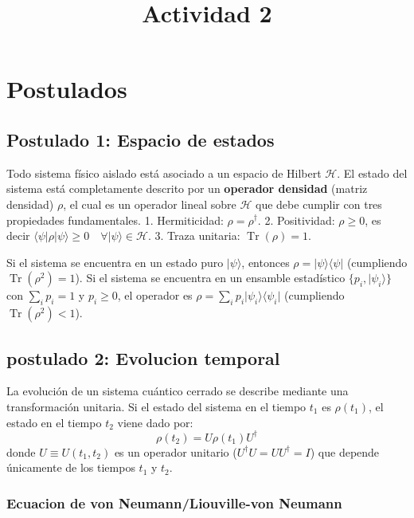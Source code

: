 \documentclass[11pt]{article}
\title{Actividad 2}
\begin{document}
    
    \maketitle
    
    

    
    \section{Postulados}\label{postulados}

\subsection{Postulado 1: Espacio de
estados}\label{postulado-1-espacio-de-estados}

Todo sistema físico aislado está asociado a un espacio de Hilbert
\(\mathcal{H}\). El estado del sistema está completamente descrito por
un \textbf{operador densidad} (matriz densidad) \(\rho\), el cual es un
operador lineal sobre \(\mathcal{H}\) que debe cumplir con tres
propiedades fundamentales. 1. Hermiticidad: \(\rho = \rho^{\dagger}\).
2. Positividad: \(\rho \ge 0\), es decir
\(\langle\psi\vert{}\rho\vert{}\psi\rangle \ge 0 \quad \forall \vert{}\psi\rangle \in \mathcal{H}\).
3. Traza unitaria: \(\operatorname{Tr}(\rho) = 1\).

Si el sistema se encuentra en un estado puro \(\vert{}\psi\rangle\),
entonces \(\rho = \vert{}\psi\rangle\langle\psi\vert{}\) (cumpliendo
\(\operatorname{Tr}(\rho^2) = 1\)). Si el sistema se encuentra en un
ensamble estadístico \(\{p_i, \vert{}\psi_i\rangle\}\) con
\(\sum_i p_i = 1\) y \(p_i \ge 0\), el operador es
\(\rho = \sum_i p_i \vert{}\psi_i\rangle\langle\psi_i\vert{}\)
(cumpliendo \(\operatorname{Tr}(\rho^2) < 1\)).

    \subsection{postulado 2: Evolucion
temporal}\label{postulado-2-evolucion-temporal}

La evolución de un sistema cuántico cerrado se describe mediante una
transformación unitaria. Si el estado del sistema en el tiempo \(t_1\)
es \(\rho(t_1)\), el estado en el tiempo \(t_2\) viene dado por:
\[\rho(t_2) = U \rho(t_1) U^\dagger\] donde \(U \equiv U(t_1, t_2)\) es
un operador unitario (\(U^\dagger U = U U^\dagger = I\)) que depende
únicamente de los tiempos \(t_1\) y \(t_2\).

\subsubsection{Ecuacion de von Neumann/Liouville-von
Neumann}\label{ecuacion-de-von-neumannliouville-von-neumann}
\end{document}
